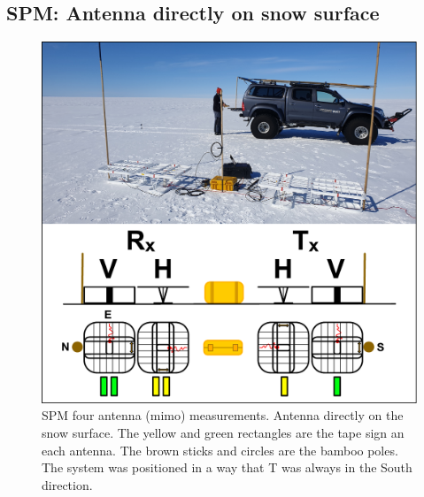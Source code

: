 \documentclass[a4paper,12pt]{article}
\begin{document}
\subsection{SPM: Antenna directly on snow surface}
\begin{figure}[H]
	\includegraphics[width=\linewidth]{Figures/SPM_OnSurface.pdf}
	\caption{SPM four antenna (mimo) measurements. Antenna directly on the snow surface.
  The yellow and green rectangles are the tape sign an each antenna. 
  The brown sticks and circles are the bamboo poles.
  The system was positioned in a way that T was always in the South direction.}
	\label{fig_SPM_surface}
\end{figure}
\end{document}
